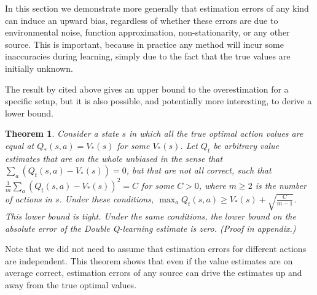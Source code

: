 \documentclass[letterpaper]{article}
\newtheorem{theorem}{Theorem}
\begin{document}
In this section we demonstrate more generally that estimation errors of any kind can induce an upward bias, regardless of whether these errors are due to environmental noise, function approximation, non-stationarity, or any other source.  This is important, because in practice any method will incur some inaccuracies during learning, simply due to the fact that the true values are initially unknown.

The result by \citet{Thrun:1993} cited above gives an upper bound to the overestimation for a specific setup, but it is also possible, and potentially more interesting, to derive a lower bound.
\begin{theorem}\label{thm:lower_bound}
Consider a state $s$ in which all the true optimal action values are equal at $Q_*(s,a) = V_*(s)$ for some $V_*(s)$. Let $Q_t$ be arbitrary value estimates that are on the whole unbiased in the sense that $\sum_a ( Q_t(s,a) - V_*(s) ) = 0$, but that are not all correct, such that $\frac{1}{m} \sum_a ( Q_t(s,a) - V_*(s) )^2 = C$ for some $C > 0$, where $m \ge 2$ is the number of actions in $s$. Under these conditions, $\max_a Q_t(s,a) \ge V_*(s) + \sqrt{\frac{C}{m-1}}$.  This lower bound is tight. Under the same conditions, the lower bound on the absolute error of the Double Q-learning estimate is zero. (Proof in appendix.)
\end{theorem}
Note that we did not need to assume that estimation errors for different actions are independent.
This theorem shows that even if the value estimates are on average correct, estimation errors of any source can drive the estimates up and away from the true optimal values.
\end{document}
